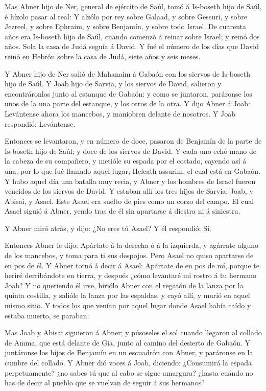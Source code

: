  Mas Abner hijo de Ner, general de ejército de Saúl, tomó á
Is-boseth hijo de Saúl, é hízolo pasar al real:  Y alzólo
por rey sobre Galaad, y sobre Gessuri, y sobre Jezreel, y sobre Ephraim,
y sobre Benjamín, y sobre todo Israel.  De cuarenta años
era Is-boseth hijo de Saúl, cuando comenzó á reinar sobre Israel; y
reinó dos años. Sola la casa de Judá seguía á David.  Y fué
el número de los días que David reinó en Hebrón sobre la casa de Judá,
siete años y seis meses.

 Y Abner hijo de Ner salió de Mahanaim á Gabaón con los
siervos de Is-boseth hijo de Saúl.  Y Joab hijo de Sarvia,
y los siervos de David, salieron y encontráronlos junto al estanque de
Gabaón: y como se juntaron, paráronse los unos de la una parte del
estanque, y los otros de la otra.  Y dijo Abner á Joab:
Levántense ahora los mancebos, y maniobren delante de nosotros. Y Joab
respondió: Levántense.

 Entonces se levantaron, y en número de doce, pasaron de
Benjamín de la parte de Is-boseth hijo de Saúl; y doce de los siervos de
David.  Y cada uno echó mano de la cabeza de su compañero,
y metióle su espada por el costado, cayendo así á una; por lo que fué
llamado aquel lugar, Helcath-assurim, el cual está en Gabaón.
 Y hubo aquel día una batalla muy recia, y Abner y los
hombres de Israel fueron vencidos de los siervos de David. 
Y estaban allí los tres hijos de Sarvia: Joab, y Abisai, y Asael. Este
Asael era suelto de pies como un corzo del campo.  El cual
Asael siguió á Abner, yendo tras de él sin apartarse á diestra ni á
siniestra.

 Y Abner miró atrás, y dijo: ¿No eres tú Asael? Y él
respondió: Sí.

 Entonces Abner le dijo: Apártate á la derecha ó á la
izquierda, y agárrate alguno de los mancebos, y toma para ti sus
despojos. Pero Asael no quiso apartarse de en pos de él.  Y
Abner tornó á decir á Asael: Apártate de en pos de mí, porque te heriré
derribándote en tierra, y después ¿cómo levantaré mi rostro á tu hermano
Joab?  Y no queriendo él irse, hiriólo Abner con el regatón
de la lanza por la quinta costilla, y salióle la lanza por las espaldas,
y cayó allí, y murió en aquel mismo sitio. Y todos los que venían por
aquel lugar donde Asael había caído y estaba muerto, se paraban.

 Mas Joab y Abisai siguieron á Abner; y púsoseles el sol
cuando llegaron al collado de Amma, que está delante de Gía, junto al
camino del desierto de Gabaón.  Y juntáronse los hijos de
Benjamín en un escuadrón con Abner, y paráronse en la cumbre del
collado.  Y Abner dió voces á Joab, diciendo: ¿Consumirá la
espada perpetuamente? ¿no sabes tú que al cabo se sigue amargura? ¿hasta
cuándo no has de decir al pueblo que se vuelvan de seguir á sus
hermanos?

